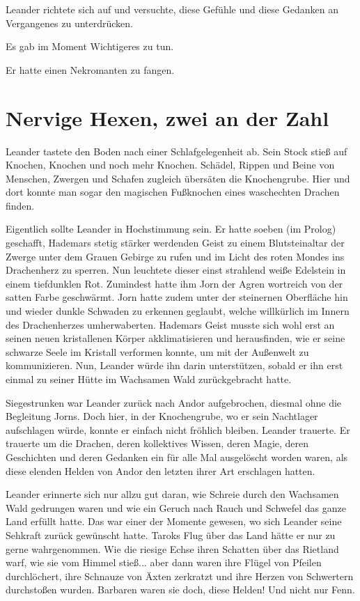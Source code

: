 Leander richtete sich auf und versuchte, diese Gefühle und diese Gedanken an Vergangenes zu unterdrücken.

Es gab im Moment Wichtigeres zu tun.

Er hatte einen Nekromanten zu fangen.











\newpage
\section{Nervige Hexen, zwei an der Zahl}


Leander tastete den Boden nach einer Schlafgelegenheit ab. Sein Stock stieß auf Knochen, Knochen und noch mehr Knochen. Schädel, Rippen und Beine von Menschen, Zwergen und Schafen zugleich übersäten die Knochengrube. Hier und dort konnte man sogar den magischen Fußknochen eines waschechten Drachen finden.

Eigentlich sollte Leander in Hochstimmung sein. Er hatte soeben (im Prolog) geschafft, Hademars stetig stärker werdenden Geist zu einem Blutsteinaltar der Zwerge unter dem Grauen Gebirge zu rufen und im Licht des roten Mondes ins Drachenherz zu sperren. Nun leuchtete dieser einst strahlend weiße Edelstein in einem tiefdunklen Rot. Zumindest hatte ihm Jorn der Agren wortreich von der satten Farbe geschwärmt. Jorn hatte zudem unter der steinernen Oberfläche hin und wieder dunkle Schwaden zu erkennen geglaubt, welche willkürlich im Innern des Drachenherzes umherwaberten. Hademars Geist musste sich wohl erst an seinen neuen kristallenen Körper akklimatisieren und herausfinden, wie er seine schwarze Seele im Kristall verformen konnte, um mit der Außenwelt zu kommunizieren. Nun, Leander würde ihn darin unterstützen, sobald er ihn erst einmal zu seiner Hütte im Wachsamen Wald zurückgebracht hatte.

Siegestrunken war Leander zurück nach Andor aufgebrochen, diesmal ohne die Begleitung Jorns. Doch hier, in der Knochengrube, wo er sein Nachtlager aufschlagen würde, konnte er einfach nicht fröhlich bleiben. Leander trauerte. Er trauerte um die Drachen, deren kollektives Wissen, deren Magie, deren Geschichten und deren Gedanken ein für alle Mal ausgelöscht worden waren, als diese elenden Helden von Andor den letzten ihrer Art erschlagen hatten.

Leander erinnerte sich nur allzu gut daran, wie Schreie durch den Wachsamen Wald gedrungen waren und wie ein Geruch nach Rauch und Schwefel das ganze Land erfüllt hatte. Das war einer der Momente gewesen, wo sich Leander seine Sehkraft zurück gewünscht hatte. Taroks Flug über das Land hätte er nur zu gerne wahrgenommen. Wie die riesige Echse ihren Schatten über das Rietland warf, wie sie vom Himmel stieß... aber dann waren ihre Flügel von Pfeilen durchlöchert, ihre Schnauze von Äxten zerkratzt und ihre Herzen von Schwertern durchstoßen wurden. Barbaren waren sie doch, diese Helden! Und nicht nur Fenn.

